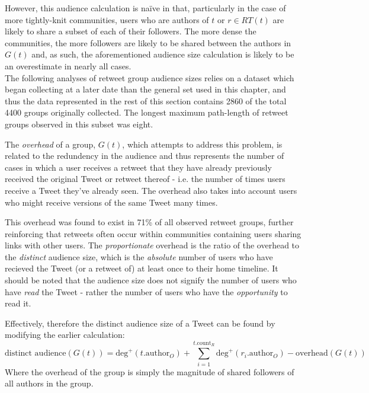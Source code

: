 However, this audience calculation is na{\"i}ve in that, particularly in the case of more tightly-knit communities, users who are authors of $t$ or $r \in RT(t)$ are likely to share a subset of each of their followers. The more dense the communities, the more followers are likely to be shared between the authors in $G(t)$ and, as such, the aforementioned audience size calculation is likely to be an overestimate in nearly all cases.\\
The following analyses of retweet group audience sizes relies on a dataset which began collecting at a later date than the general set used in this chapter, and thus the data represented in the rest of this section contains 2860 of the total 4400 groups originally collected. The longest maximum path-length of retweet groups observed in this subset was eight.

The \textit{overhead} of a group, $G(t)$, which attempts to address this problem, is related to the redundency in the audience and thus represents the number of cases in which a user receives a retweet that they have already previously received the original Tweet or retweet thereof - i.e. the number of times users receive a Tweet they've already seen. The overhead also takes into account users who might receive versions of the same Tweet many times.

This overhead was found to exist in 71\% of all observed retweet groups, further reinforcing that retweets often occur within communities containing users sharing links with other users. The \textit{proportionate} overhead is the ratio of the overhead to the \textit{distinct} audience size, which is the \textit{absolute} number of users who have recieved the Tweet (or a retweet of) at least once to their home timeline. It should be noted that the audience size does not signify the number of users who have \textit{read} the Tweet - rather the number of users who have the \textit{opportunity} to read it.

Effectively, therefore the distinct audience size of a Tweet can be found by modifying the earlier calculation:
\[
	\textrm{distinct audience}(G(t)) = \textrm{deg}^+(t.\textrm{author}_O) + \sum\limits_{i=1}^{t.\mathrm{count}_R} \textrm{deg}^+(r_i.\textrm{author}_O) - \textrm{overhead}(G(t))
\]
Where the overhead of the group is simply the magnitude of shared followers of all authors in the group.

